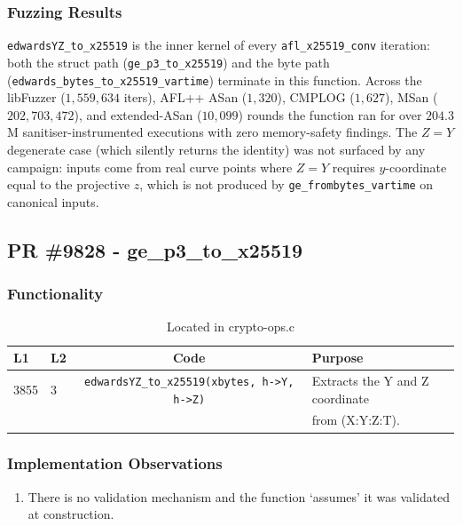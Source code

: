 \documentclass[12pt,titlepage,table]{article}
\begin{document}
\subsubsection{Fuzzing Results}
\verb+edwardsYZ_to_x25519+ is the inner kernel of every \verb+afl_x25519_conv+ iteration: both the struct path (\verb+ge_p3_to_x25519+) and the byte path (\verb+edwards_bytes_to_x25519_vartime+) terminate in this function.  Across the libFuzzer ($1{,}559{,}634$ iters), AFL++ ASan ($1{,}320$), CMPLOG ($1{,}627$), MSan ($202{,}703{,}472$), and extended-ASan ($10{,}099$) rounds the function ran for over $204.3$M sanitiser-instrumented executions with zero memory-safety findings.  The $Z = Y$ degenerate case (which silently returns the identity) was not surfaced by any campaign: inputs come from real curve points where $Z = Y$ requires $y$-coordinate equal to the projective $z$, which is not produced by \verb+ge_frombytes_vartime+ on canonical inputs.

\newpage
\subsection{PR \#9828 - ge\_p3\_to\_x25519}
\subsubsection{Functionality}


\begin{table}[htbp]
\centering
\caption{ge\_p3\_to\_x25519 Source To Spec Map}
{
\begin{tabular}{| l | l | c | l |}
\hline
\textbf{L1} & \textbf{L2} & \textbf{Code} & \textbf{Purpose} \\
\hline
\hline
3855 & 3 &\verb+edwardsYZ_to_x25519(xbytes, h->Y, h->Z)+ & Extracts the Y and Z coordinate \\
&&&from (X:Y:Z:T). \\
\hline
\end{tabular}}
\caption*{Located in crypto-ops.c}
\end{table}

\subsubsection{Implementation Observations}
\begin{enumerate}
\item There is no validation mechanism and the function `assumes' it was validated at construction.
\end{enumerate}
\end{document}
